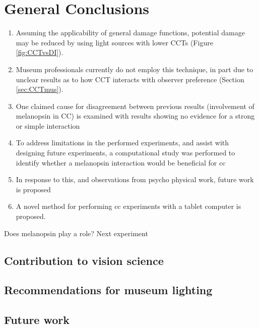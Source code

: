 \chapter{General Conclusions}
\label{chap:Conclusions}

\begin{enumerate}
\item Assuming the applicability of general damage functions, potential damage may be reduced by using light sources with lower \glspl{CCT} (Figure \ref{fig:CCTvsDI}).
\item Museum professionals currently do not employ this technique, in part due to unclear results as to how \gls{CCT} interacts with observer preference (Section \ref{sec:CCTmus}).
\item One claimed cause for disagreement between previous results (involvement of melanopsin in CC) is examined with results showing no evidence for a strong or simple interaction
\item To address limitations in the performed experiments, and assist with designing future experiments, a computational study was performed to identify whether a melanopsin interaction would be beneficial for cc
\item In response to this, and observations from psycho physical work, future work is proposed
\item A novel method for performing cc experiments with a tablet computer is proposed.
\end{enumerate}

Does melanopsin play a role?
Next experiment

\section{Contribution to vision science}
\section{Recommendations for museum lighting}
\section{Future work}

